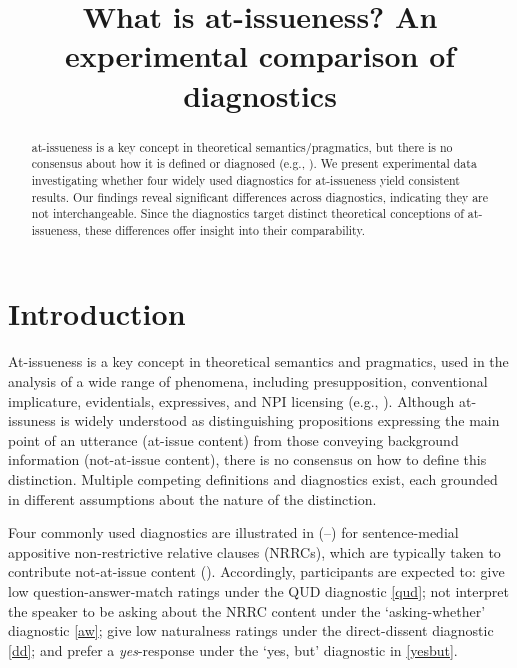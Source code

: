 \documentclass[times,linguex,xcolor]{glossa}
\title[What is at-issueness?]{What is at-issueness? An experimental comparison of diagnostics\\ 
  }
\author[]%
{%
}
\begin{document}
\maketitle


\begin{abstract}
  at-issueness is a key concept in theoretical semantics/pragmatics, but there is no consensus about how it is defined or diagnosed (e.g., \citealt{tonhauser_diagnosing_2012,tonhauser_how_2018,koev_notions_2018}). We present experimental data investigating whether four widely used diagnostics for at-issueness yield consistent results. Our findings reveal significant differences across diagnostics, indicating they are not interchangeable. Since the diagnostics target distinct theoretical conceptions of at-issueness, these differences offer insight into their comparability.

\end{abstract}


\section{Introduction \label{sec:1_introduction}}
  At-issueness is a key concept in theoretical semantics and pragmatics, used in the analysis of a wide range of phenomena, including presupposition, conventional implicature, evidentials, expressives, and NPI licensing (e.g., \citealt{karttunen_conventional_1979,horton_presuppositions_1988,abbott_presuppositions_2000,faller_semantics_2003,potts_logic_2005,tonhauser_diagnosing_2012,horn_licensing_2016}). Although at-issuness is widely understood as distinguishing propositions expressing the main point of an utterance (at-issue content) from those conveying background information (not-at-issue content), there is no consensus on how to define this distinction. Multiple competing definitions and diagnostics exist, each grounded in different assumptions about the nature of the distinction.

    Four commonly used diagnostics are illustrated in (--) for sentence-medial appositive non-restrictive relative clauses (NRRCs), which are typically taken to contribute not-at-issue content (\citealt{potts_logic_2005}). Accordingly, participants are expected to: give low question-answer-match ratings under the QUD diagnostic \ref{qud}; not interpret the speaker to be asking about the NRRC content under the `asking-whether' diagnostic \ref{aw}; give low naturalness ratings under the direct-dissent diagnostic \ref{dd}; and prefer a \emph{yes}-response under the `yes, but' diagnostic in \ref{yesbut}.
\end{document}
